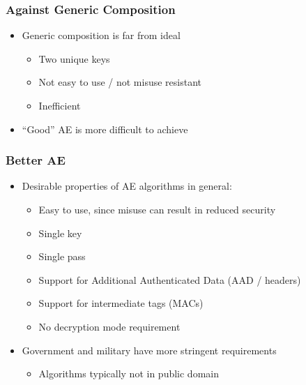 \begin{frame}
\frametitle{Against Generic Composition}
\begin{itemize}
  \item Generic composition is far from ideal
  \begin{itemize}
    \item Two unique keys
    \item Not easy to use / not misuse resistant
    \item Inefficient
  \end{itemize}
  \item ``Good'' AE is more difficult to achieve
\end{itemize}
\end{frame}

\begin{frame}
\frametitle{Better AE}
\begin{itemize}
  \item Desirable properties of AE algorithms in general:
  \begin{itemize}
    \item Easy to use, since misuse can result in reduced security
    \item Single key
    \item Single pass
    \item Support for Additional Authenticated Data (AAD / headers)
    \item Support for intermediate tags (MACs)
    \item No decryption mode requirement
  \end{itemize}
  \item Government and military have more stringent requirements
  \begin{itemize}
    \item Algorithms typically not in public domain
  \end{itemize}
\end{itemize}
\end{frame}

